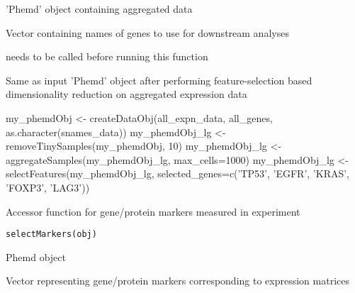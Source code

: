 \documentclass[a4paper]{book}
\begin{document}
%
\begin{Arguments}
\begin{ldescription}
\item[\code{obj}] 'Phemd' object containing aggregated data

\item[\code{selected\_genes}] Vector containing names of genes to use for downstream analyses
\end{ldescription}
\end{Arguments}
%
\begin{Details}\relax
{} needs to be called before running this function
\end{Details}
%
\begin{Value}
Same as input 'Phemd' object after performing feature-selection based dimensionality reduction on aggregated expression data
\end{Value}
%
\begin{Examples}
\begin{ExampleCode}

my_phemdObj <- createDataObj(all_expn_data, all_genes, as.character(snames_data))
my_phemdObj_lg <- removeTinySamples(my_phemdObj, 10)
my_phemdObj_lg <- aggregateSamples(my_phemdObj_lg, max_cells=1000)
my_phemdObj_lg <- selectFeatures(my_phemdObj_lg, selected_genes=c('TP53',
'EGFR', 'KRAS', 'FOXP3', 'LAG3'))

\end{ExampleCode}
\end{Examples}
%
\begin{Description}\relax
Accessor function for gene/protein markers measured in experiment
\end{Description}
%
\begin{Usage}
\begin{verbatim}
selectMarkers(obj)
\end{verbatim}
\end{Usage}
%
\begin{Arguments}
\begin{ldescription}
\item[\code{obj}] Phemd object
\end{ldescription}
\end{Arguments}
%
\begin{Value}
Vector representing gene/protein markers corresponding to expression matrices
\end{Value}
\end{document}
